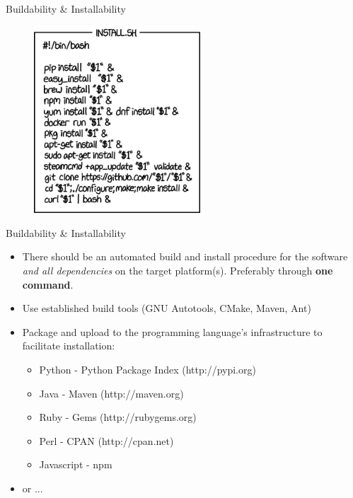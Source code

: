 \documentclass[compress]{beamer}
\begin{document}
\begin{frame}{Buildability \& Installability}
\begin{figure}
\includegraphics[height=7cm]{img/install.png}
\end{figure}
\end{frame}


\begin{frame}{Buildability \& Installability}
    \begin{itemize}
        \item There should be an automated build and install procedure for the software
            \emph{and all dependencies} on the target platform(s). Preferably
            through \textbf{one command}. 
        \item Use established build tools (GNU Autotools, CMake, Maven, Ant)
        \item Package and upload to the programming language's infrastructure to facilitate installation:
            \begin{itemize}
                \item Python - Python Package Index (http://pypi.org)
                \item Java - Maven (http://maven.org)
                \item Ruby - Gems (http://rubygems.org)
                \item Perl - CPAN (http://cpan.net)
                \item Javascript - npm
            \end{itemize}
        \item or  ...
    \end{itemize}
\end{frame}
\end{document}
